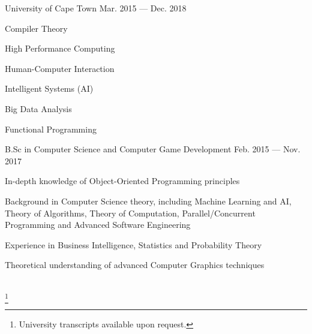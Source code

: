 
\begin{cventries}
  {University of Cape Town}
  {Mar. 2015 --- Dec. 2018}
  {}
  {
    \begin{cvitems}
      \item {Compiler Theory}
      \item {High Performance Computing}
      \item {Human-Computer Interaction}
      \item {Intelligent Systems (AI)}
      \item {Big Data Analysis}
      \item {Functional Programming}
    \end{cvitems}
  }

  {B.Sc in Computer Science and Computer Game Development}
  {Feb. 2015 --- Nov. 2017}
  {}
  {
    \begin{cvitems}
      \item {In-depth knowledge of Object-Oriented Programming principles}
      \item {Background in Computer Science theory, including Machine Learning and AI, Theory of Algorithms, Theory of Computation, Parallel/Concurrent Programming and Advanced Software Engineering}
      \item {Experience in Business Intelligence, Statistics and Probability Theory}
      \item {Theoretical understanding of advanced Computer Graphics techniques}
    \end{cvitems}
  }\\\vspace{5mm}\footnote{University transcripts available upon request.}

\end{cventries}

